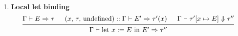 \documentclass{article}
\begin{document}
\begin{definition} 
\begin{enumerate}
  \item \textbf{Local let binding} \\
    \[
      \begin{prooftree}
        \hypo{\Gamma \vdash E \Rightarrow \tau}
        \hypo{(x, \, \tau, \, \text{undefined}) :: \Gamma \vdash E' \Rightarrow \tau'(x)}
        \hypo{\Gamma \vdash \tau'[x \mapsto E] \Downarrow \tau''}
        \infer3{\Gamma \vdash \text{let } x := E \text{ in } E' \Rightarrow \tau''}
      \end{prooftree}
    \]






\end{enumerate}
\end{definition}
\end{document}
